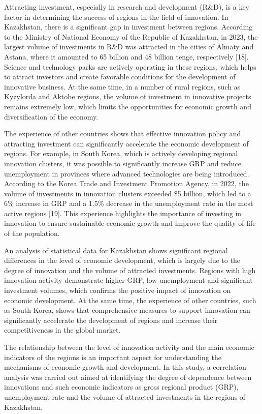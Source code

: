 Attracting investment, especially in research and development (R\&D), is
a key factor in determining the success of regions in the field of
innovation. In Kazakhstan, there is a significant gap in investment
between regions. According to the Ministry of National Economy of the
Republic of Kazakhstan, in 2023, the largest volume of investments in
R\&D was attracted in the cities of Almaty and Astana, where it amounted
to 65 billion and 48 billion tenge, respectively {[}18{]}. Science and
technology parks are actively operating in these regions, which helps to
attract investors and create favorable conditions for the development of
innovative business. At the same time, in a number of rural regions,
such as Kyzylorda and Aktobe regions, the volume of investment in
innovative projects remains extremely low, which limits the
opportunities for economic growth and diversification of the economy.

The experience of other countries shows that effective innovation policy
and attracting investment can significantly accelerate the economic
development of regions. For example, in South Korea, which is actively
developing regional innovation clusters, it was possible to
significantly increase GRP and reduce unemployment in provinces where
advanced technologies are being introduced. According to the Korea Trade
and Investment Promotion Agency, in 2022, the volume of investments in
innovation clusters exceeded \$5 billion, which led to a 6\% increase in
GRP and a 1.5\% decrease in the unemployment rate in the most active
regions {[}19{]}. This experience highlights the importance of investing
in innovation to ensure sustainable economic growth and improve the
quality of life of the population.

An analysis of statistical data for Kazakhstan shows significant
regional differences in the level of economic development, which is
largely due to the degree of innovation and the volume of attracted
investments. Regions with high innovation activity demonstrate higher
GRP, low unemployment and significant investment volumes, which confirms
the positive impact of innovation on economic development. At the same
time, the experience of other countries, such as South Korea, shows that
comprehensive measures to support innovation can significantly
accelerate the development of regions and increase their competitiveness
in the global market.

The relationship between the level of innovation activity and the main
economic indicators of the regions is an important aspect for
understanding the mechanisms of economic growth and development. In this
study, a correlation analysis was carried out aimed at identifying the
degree of dependence between innovations and such economic indicators as
gross regional product (GRP), unemployment rate and the volume of
attracted investments in the regions of Kazakhstan.

